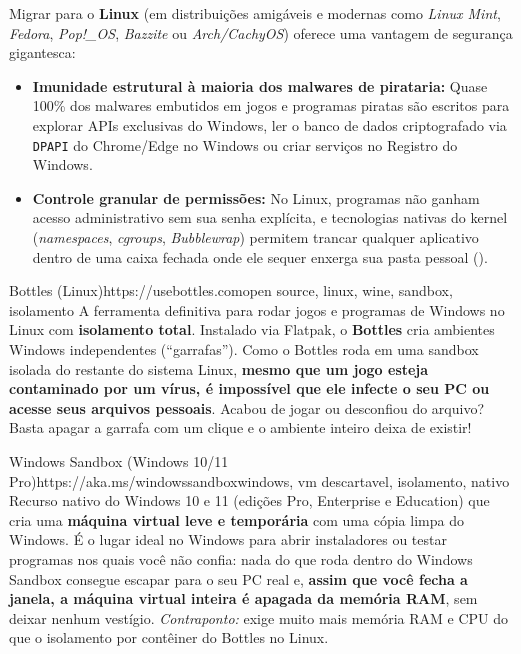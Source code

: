 \documentclass{pousadaguide}
\begin{document}
Migrar para o \textbf{Linux} (em distribuições amigáveis e modernas como \emph{Linux Mint}, \emph{Fedora}, \emph{Pop!\_OS}, \emph{Bazzite} ou \emph{Arch/CachyOS}) oferece uma vantagem de segurança gigantesca:
\begin{itemize}
  \item \textbf{Imunidade estrutural à maioria dos malwares de pirataria:} Quase 100\% dos malwares embutidos em jogos e programas piratas são escritos para explorar APIs exclusivas do Windows, ler o banco de dados criptografado via \texttt{DPAPI} do Chrome/Edge no Windows ou criar serviços no Registro do Windows.
  \item \textbf{Controle granular de permissões:} No Linux, programas não ganham acesso administrativo sem sua senha explícita, e tecnologias nativas do kernel (\emph{namespaces}, \emph{cgroups}, \emph{Bubblewrap}) permitem trancar qualquer aplicativo dentro de uma caixa fechada onde ele sequer enxerga sua pasta pessoal ().
\end{itemize}

\begin{ferramenta}[goat,logo=bottles]{Bottles (Linux)}{https://usebottles.com}{open source, linux, wine, sandbox, isolamento}
A ferramenta definitiva para rodar jogos e programas de Windows no Linux com \textbf{isolamento total}. Instalado via Flatpak, o \textbf{Bottles} cria ambientes Windows independentes (``garrafas''). Como o Bottles roda em uma sandbox isolada do restante do sistema Linux, \textbf{mesmo que um jogo esteja contaminado por um vírus, é impossível que ele infecte o seu PC ou acesse seus arquivos pessoais}. Acabou de jogar ou desconfiou do arquivo? Basta apagar a garrafa com um clique e o ambiente inteiro deixa de existir! 
\end{ferramenta}

\begin{ferramenta}[recomendado,logo=windows-sandbox]{Windows Sandbox (Windows 10/11 Pro)}{https://aka.ms/windowssandbox}{windows, vm descartavel, isolamento, nativo}
Recurso nativo do Windows 10 e 11 (edições Pro, Enterprise e Education) que cria uma \textbf{máquina virtual leve e temporária} com uma cópia limpa do Windows. É o lugar ideal no Windows para abrir instaladores ou testar programas nos quais você não confia: nada do que roda dentro do Windows Sandbox consegue escapar para o seu PC real e, \textbf{assim que você fecha a janela, a máquina virtual inteira é apagada da memória RAM}, sem deixar nenhum vestígio. \emph{Contraponto:} exige muito mais memória RAM e CPU do que o isolamento por contêiner do Bottles no Linux. 
\end{ferramenta}
\end{document}
